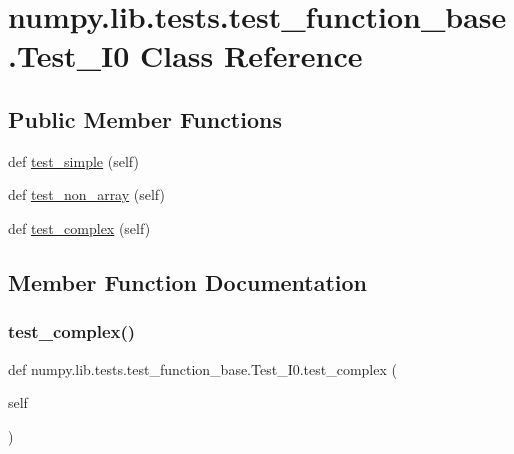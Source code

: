\hypertarget{classnumpy_1_1lib_1_1tests_1_1test__function__base_1_1Test__I0}{}\section{numpy.\+lib.\+tests.\+test\+\_\+function\+\_\+base.\+Test\+\_\+\+I0 Class Reference}
\label{classnumpy_1_1lib_1_1tests_1_1test__function__base_1_1Test__I0}
\subsection*{Public Member Functions}
\begin{DoxyCompactItemize}
\item 
def \hyperlink{classnumpy_1_1lib_1_1tests_1_1test__function__base_1_1Test__I0_a2d120ced6f62c9d21532277f32293d4b}{test\+\_\+simple} (self)
\item 
def \hyperlink{classnumpy_1_1lib_1_1tests_1_1test__function__base_1_1Test__I0_af99c9234c603a18bc2c0edc26656ab3c}{test\+\_\+non\+\_\+array} (self)
\item 
def \hyperlink{classnumpy_1_1lib_1_1tests_1_1test__function__base_1_1Test__I0_a64dbe5788354cc2f5ccad706498ddace}{test\+\_\+complex} (self)
\end{DoxyCompactItemize}


\subsection{Member Function Documentation}
\mbox{\label{classnumpy_1_1lib_1_1tests_1_1test__function__base_1_1Test__I0_a64dbe5788354cc2f5ccad706498ddace}} 
\subsubsection{\texorpdfstring{test\+\_\+complex()}{test\_complex()}}
{\footnotesize\ttfamily def numpy.\+lib.\+tests.\+test\+\_\+function\+\_\+base.\+Test\+\_\+\+I0.\+test\+\_\+complex (\begin{DoxyParamCaption}\item[{}]{self }\end{DoxyParamCaption})}

